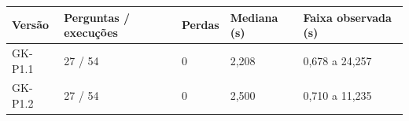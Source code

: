\begin{tabularx}{\textwidth}{L{2.1cm} L{2.2cm} L{1.8cm} L{2.4cm} Y}
\toprule Versão & Perguntas / execuções & Perdas & Mediana (s) & Faixa observada (s) \\ \midrule
GK-P1.1 & 27 / 54 & 0 & 2,208 & 0,678 a 24,257 \\
GK-P1.2 & 27 / 54 & 0 & 2,500 & 0,710 a 11,235 \\
\bottomrule\end{tabularx}
